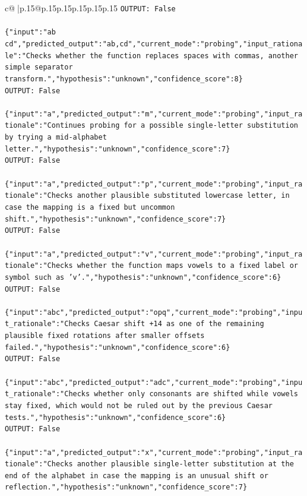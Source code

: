 \documentclass{article}
\begin{document}
{\begin{supertabular}{c@{$\;$}|p{.15\linewidth}@{}p{.15\linewidth}p{.15\linewidth}p{.15\linewidth}p{.15\linewidth}p{.15\linewidth}}
{{{\texttt{OUTPUT: False} \\
\\ 
\texttt{\{"input":"ab cd","predicted\_output":"ab,cd","current\_mode":"probing","input\_rationale":"Checks whether the function replaces spaces with commas, another simple separator transform.","hypothesis":"unknown","confidence\_score":8\}} \\
\texttt{OUTPUT: False} \\
\\ 
\texttt{\{"input":"a","predicted\_output":"m","current\_mode":"probing","input\_rationale":"Continues probing for a possible single{-}letter substitution by trying a mid{-}alphabet letter.","hypothesis":"unknown","confidence\_score":7\}} \\
\texttt{OUTPUT: False} \\
\\ 
\texttt{\{"input":"a","predicted\_output":"p","current\_mode":"probing","input\_rationale":"Checks another plausible substituted lowercase letter, in case the mapping is a fixed but uncommon shift.","hypothesis":"unknown","confidence\_score":7\}} \\
\texttt{OUTPUT: False} \\
\\ 
\texttt{\{"input":"a","predicted\_output":"v","current\_mode":"probing","input\_rationale":"Checks whether the function maps vowels to a fixed label or symbol such as 'v'.","hypothesis":"unknown","confidence\_score":6\}} \\
\texttt{OUTPUT: False} \\
\\ 
\texttt{\{"input":"abc","predicted\_output":"opq","current\_mode":"probing","input\_rationale":"Checks Caesar shift +14 as one of the remaining plausible fixed rotations after smaller offsets failed.","hypothesis":"unknown","confidence\_score":6\}} \\
\texttt{OUTPUT: False} \\
\\ 
\texttt{\{"input":"abc","predicted\_output":"adc","current\_mode":"probing","input\_rationale":"Checks whether only consonants are shifted while vowels stay fixed, which would not be ruled out by the previous Caesar tests.","hypothesis":"unknown","confidence\_score":6\}} \\
\texttt{OUTPUT: False} \\
\\ 
\texttt{\{"input":"a","predicted\_output":"x","current\_mode":"probing","input\_rationale":"Checks another plausible single{-}letter substitution at the end of the alphabet in case the mapping is an unusual shift or reflection.","hypothesis":"unknown","confidence\_score":7\}} \\
}}}
\end{supertabular}}
\end{document}
